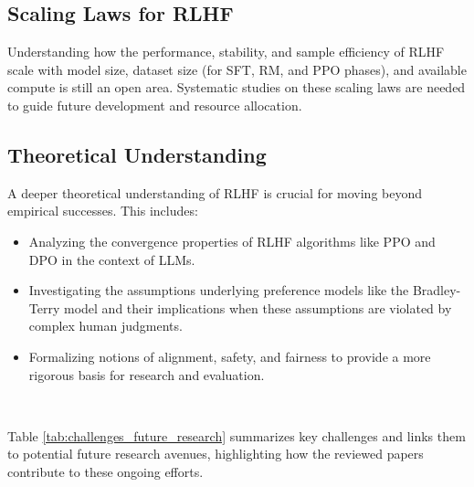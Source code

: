\documentclass[10pt,journal,compsoc]{IEEEtran} %
\begin{document}
\subsection{Scaling Laws for RLHF}
Understanding how the performance, stability, and sample efficiency of RLHF scale with model size, dataset size (for SFT, RM, and PPO phases), and available compute is still an open area. Systematic studies on these scaling laws are needed to guide future development and resource allocation.  

\subsection{Theoretical Understanding}
A deeper theoretical understanding of RLHF is crucial for moving beyond empirical successes. This includes:
\begin{itemize}
\item Analyzing the convergence properties of RLHF algorithms like PPO and DPO in the context of LLMs.
\item Investigating the assumptions underlying preference models like the Bradley-Terry model and their implications when these assumptions are violated by complex human judgments.
\item Formalizing notions of alignment, safety, and fairness to provide a more rigorous basis for research and evaluation.
\end{itemize}  

Table \ref{tab:challenges_future_research} summarizes key challenges and links them to potential future research avenues, highlighting how the reviewed papers contribute to these ongoing efforts.
\end{document}
